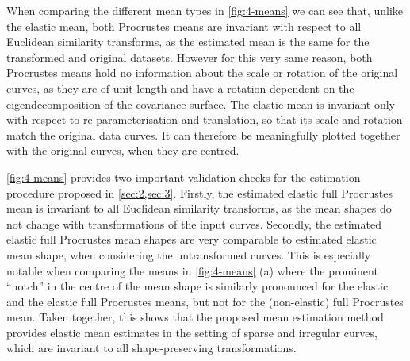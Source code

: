 When comparing the different mean types in \cref{fig:4-means} we can see that, unlike the elastic mean, both Procrustes means are invariant with respect to all Euclidean similarity transforms, as the estimated mean is the same for the transformed and original datasets.
However for this very same reason, both Procrustes means hold no information about the scale or rotation of the original curves, as they are of unit-length and have a rotation dependent on the eigendecomposition of the covariance surface.
The elastic mean is invariant only with respect to re-parameterisation and translation, so that its scale and rotation match the original data curves.
It can therefore be meaningfully plotted together with the original curves, when they are centred.

\cref{fig:4-means} provides two important validation checks for the estimation procedure proposed in \cref{sec:2,sec:3}.
Firstly, the estimated elastic full Procrustes mean is invariant to all Euclidean similarity transforms, as the mean shapes do not change with transformations of the input curves.
Secondly, the estimated elastic full Procrustes mean shapes are very comparable to estimated elastic mean shape, when considering the untransformed curves.
This is especially notable when comparing the means in \cref{fig:4-means} (a) where the prominent \enquote{notch} in the centre of the mean shape is similarly pronounced for the elastic and the elastic full Procrustes means, but not for the (non-elastic) full Procrustes mean.
Taken together, this shows that the proposed mean estimation method provides elastic mean estimates in the setting of sparse and irregular curves, which are invariant to all shape-preserving transformations.


